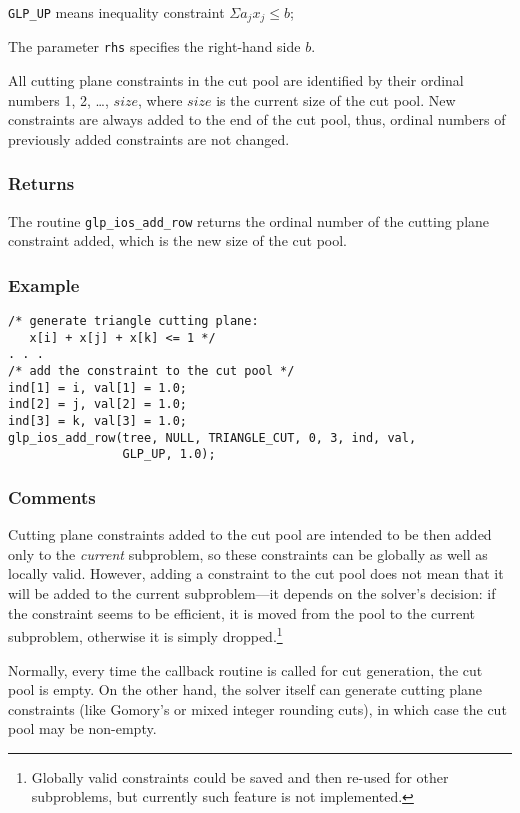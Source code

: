 \verb|GLP_UP| means inequality constraint $\Sigma a_jx_j\leq b$;

The parameter \verb|rhs| specifies the right-hand side $b$.

All cutting plane constraints in the cut pool are identified by their
ordinal numbers 1, 2, \dots, $size$, where $size$ is the current size
of the cut pool. New constraints are always added to the end of the cut
pool, thus, ordinal numbers of previously added constraints are not
changed.

\subsubsection*{Returns}

The routine \verb|glp_ios_add_row| returns the ordinal number of the
cutting plane constraint added, which is the new size of the cut pool.

\subsubsection*{Example}

\begin{verbatim}
/* generate triangle cutting plane:
   x[i] + x[j] + x[k] <= 1 */
. . .
/* add the constraint to the cut pool */
ind[1] = i, val[1] = 1.0;
ind[2] = j, val[2] = 1.0;
ind[3] = k, val[3] = 1.0;
glp_ios_add_row(tree, NULL, TRIANGLE_CUT, 0, 3, ind, val,
                GLP_UP, 1.0);
\end{verbatim}

\subsubsection*{Comments}

Cutting plane constraints added to the cut pool are intended to be then
added only to the {\it current} subproblem, so these constraints can be
globally as well as locally valid. However, adding a constraint to the
cut pool does not mean that it will be added to the current
subproblem---it depends on the solver's decision: if the constraint
seems to be efficient, it is moved from the pool to the current
subproblem, otherwise it is simply dropped.\footnote{Globally valid
constraints could be saved and then re-used for other subproblems, but
currently such feature is not implemented.}

Normally, every time the callback routine is called for cut generation,
the cut pool is empty. On the other hand, the solver itself can generate
cutting plane constraints (like Gomory's or mixed integer rounding
cuts), in which case the cut pool may be non-empty.

